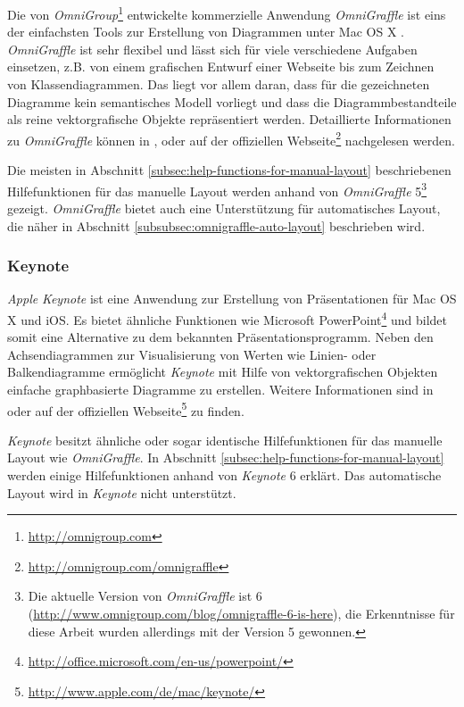 Die von \textit{OmniGroup}\footnote{\url{http://omnigroup.com}} entwickelte kommerzielle Anwendung \textit{OmniGraffle} ist eins der einfachsten Tools zur Erstellung von Diagrammen unter Mac OS X \cite{Olsen10OmniGraffle}. \textit{OmniGraffle} ist sehr flexibel und lässt sich für viele verschiedene Aufgaben einsetzen, z.B. von einem grafischen Entwurf einer Webseite bis zum Zeichnen von Klassendiagrammen. Das liegt vor allem daran, dass für die gezeichneten Diagramme kein semantisches Modell vorliegt und dass die Diagrammbestandteile als reine vektorgrafische Objekte repräsentiert werden. Detaillierte Informationen zu \textit{OmniGraffle} können in \cite{08OmniGraffle}, \cite{Olsen10OmniGraffle} oder auf der offiziellen Webseite\footnote{\url{http://omnigroup.com/omnigraffle}} nachgelesen werden.

Die meisten in Abschnitt \ref{subsec:help-functions-for-manual-layout} beschriebenen Hilfefunktionen für das manuelle Layout werden anhand von \textit{OmniGraffle} 5\footnote{Die aktuelle Version von \textit{OmniGraffle} ist 6 (\url{http://www.omnigroup.com/blog/omnigraffle-6-is-here}), die Erkenntnisse für diese Arbeit wurden allerdings mit der Version 5 gewonnen.} gezeigt. \textit{OmniGraffle} bietet auch eine Unterstützung für automatisches Layout, die näher in Abschnitt \ref{subsubsec:omnigraffle-auto-layout} beschrieben wird.

\subsubsection{Keynote}
\label{subsubsec:keynote}

\textit{Apple} \textit{Keynote} ist eine Anwendung zur Erstellung von Präsentationen für Mac OS X und iOS. Es bietet ähnliche Funktionen wie Microsoft PowerPoint\footnote{\url{http://office.microsoft.com/en-us/powerpoint/}} und bildet somit eine Alternative zu dem bekannten Präsentationsprogramm. Neben den Achsendiagrammen zur Visualisierung von Werten wie Linien- oder Balkendiagramme ermöglicht \textit{Keynote} mit Hilfe von vektorgrafischen Objekten einfache graphbasierte Diagramme zu erstellen. Weitere Informationen sind in \cite{11Keynote} oder auf der offiziellen Webseite\footnote{\url{http://www.apple.com/de/mac/keynote/}} zu finden. 

\textit{Keynote} besitzt ähnliche oder sogar identische Hilfefunktionen für das manuelle Layout wie \textit{OmniGraffle}. In Abschnitt \ref{subsec:help-functions-for-manual-layout} werden einige Hilfefunktionen anhand von \textit{Keynote} 6 erklärt. Das automatische Layout wird in \textit{Keynote} nicht unterstützt.

